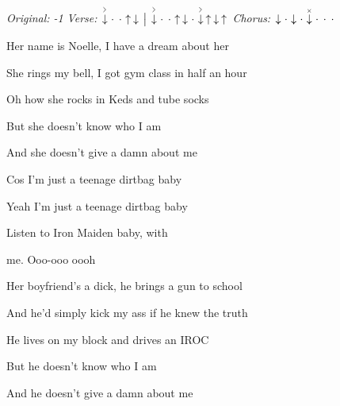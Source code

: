 \begin{song}


\begin{headerbox}
\RaiseBoxWithAccents
\textit{Original: -1} \quad
\textit{Verse:} $\AccentDown\Miss\Miss\Up\Down \Separator \AccentDown\Miss\Miss\Up\Down\Miss\AccentDown\Up\Down\Up$ \quad
\textit{Chorus:} $\Down\Miss\Down\Miss\ChuckDown\Miss\Miss\Miss$
\end{headerbox}

\begin{chordbox}
\end{chordbox}

\large

\bigskip

     \par

\bigskip

Her name is Noelle, I have a dream about her \par
{}She rings my bell, I got gym class in half an hour \par
{}Oh how she rocks in Keds and tube socks \par
But she doesn’t know who I am  \par
And she doesn’t give a damn about me \par

\bigskip

Cos I’m just a teenage dirtbag baby  \par
Yeah I’m just a teenage dirtbag baby  \par
{}Listen to Iron Maiden baby, with \par
{}me. Ooo-ooo oooh \par
{}    \par

\bigskip

Her boyfriend’s a dick, he brings a gun to school \par
And he’d simply kick my ass if he knew the truth \par
He lives on my block and drives an IROC \par
But he doesn’t know who I am  \par
And he doesn’t give a damn about me \par


\end{song}
